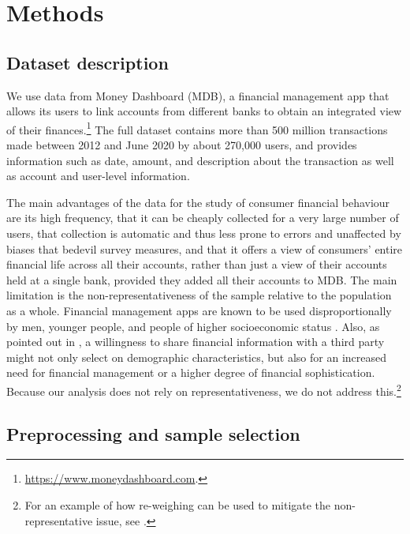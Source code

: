 
\section{Methods}%
\label{sec:methods}


\subsection{Dataset description}
\label{par:dataset_description}

We use data from Money Dashboard (MDB), a financial management app that allows
its users to link accounts from different banks to obtain an integrated view of
their
finances.\footnote{\href{https://www.moneydashboard.com}{https://www.moneydashboard.com}.}
The full dataset contains more than 500 million transactions made between 2012
and June 2020 by about 270,000 users, and provides information such as date,
amount, and description about the transaction as well as account and user-level
information.

The main advantages of the data for the study of consumer financial behaviour
are its high frequency, that it can be cheaply collected for a very large
number of users, that collection is automatic and thus less prone to errors and
unaffected by biases that bedevil survey measures, and that it offers a view of
consumers' entire financial life across all their accounts, rather than just a
view of their accounts held at a single bank, provided they added all their
accounts to MDB. The main limitation is the non-representativeness of the
sample relative to the population as a whole.  Financial management apps are
known to be used disproportionally by men, younger people, and people of higher
socioeconomic status \citep{carlin2019generational}. Also, as pointed out in
\citet{gelman2014harnessing}, a willingness to share financial information with
a third party might not only select on demographic characteristics, but also
for an increased need for financial management or a higher degree of financial
sophistication. Because our analysis does not rely on representativeness, we do
not address this.\footnote{For an example of how re-weighing can be used to
mitigate the non-representative issue, see \citet{bourquin2020effects}.}


\subsection{Preprocessing and sample selection}%
\label{par:preprocessing_and_sample_selection}

